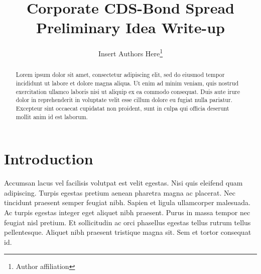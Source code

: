 \documentclass[12pt]{article}
\begin{document}
\title{
Corporate CDS-Bond Spread
\\{\color{blue} \large Preliminary Idea Write-up}
}

\author{
Insert Authors Here\footnote{Author affiliation}
}
\begin{titlepage}
% 
\maketitle


\doublespacing
\begin{abstract}
Lorem ipsum dolor sit amet, consectetur adipiscing elit, sed do eiusmod tempor
incididunt ut labore et dolore magna aliqua. Ut enim ad minim veniam, quis
nostrud exercitation ullamco laboris nisi ut aliquip ex ea commodo consequat.
Duis aute irure dolor in reprehenderit in voluptate velit esse cillum dolore
eu fugiat nulla pariatur. Excepteur sint occaecat cupidatat non proident,
sunt in culpa qui officia deserunt mollit anim id est laborum.
\end{abstract}


\end{titlepage}

\doublespacing
\section{Introduction}

Accumsan lacus vel facilisis volutpat est velit egestas. Nisi quis eleifend
quam adipiscing. Turpis egestas pretium aenean pharetra magna ac placerat.
Nec tincidunt praesent semper feugiat nibh. Sapien et ligula ullamcorper
malesuada. Ac turpis egestas integer eget aliquet nibh praesent. Purus in
massa tempor nec feugiat nisl pretium. Et sollicitudin ac orci phasellus
egestas tellus rutrum tellus pellentesque. Aliquet nibh praesent tristique
magna sit. Sem et tortor consequat id.
\end{document}
